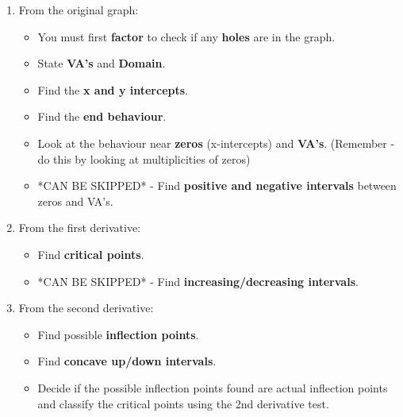 \documentclass[12pt,fleqn]{book} %
\begin{document}
\begin{enumerate}
    \item From the original graph:
          \begin{itemize}
              \item You must first \textbf{factor} to check if any \textbf{holes} are in the graph.
              \item State \textbf{VA's} and \textbf{Domain}.
              \item Find the \textbf{x and y intercepts}.
              \item Find the \textbf{end behaviour}.
              \item Look at the behaviour near \textbf{zeros} (x-intercepts) and \textbf{VA's}. (Remember - do this by looking at multiplicities of zeros)
              \item *CAN BE SKIPPED* - Find \textbf{positive and negative intervals} between zeros and VA's.
          \end{itemize}

          \vspace*{4mm}

    \item From the first derivative:
          \begin{itemize}
              \item Find \textbf{critical points}.
              \item *CAN BE SKIPPED* - Find \textbf{increasing/decreasing intervals}.
          \end{itemize}

          \vspace*{4mm}

    \item From the second derivative:
          \begin{itemize}
              \item Find possible \textbf{inflection points}.
              \item Find \textbf{concave up/down intervals}.
              \item Decide if the possible inflection points found are actual inflection points and classify the critical points using the 2nd derivative test.
          \end{itemize}
\end{enumerate}

\pagebreak


\vspace*{3mm}
\end{document}
